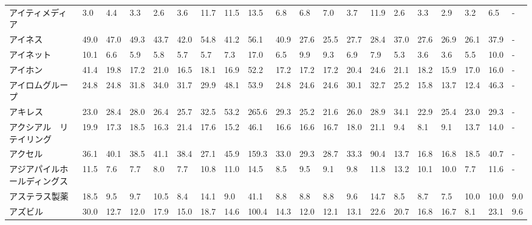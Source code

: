 \begin{tabular}{llllllllllllllllllll}
アイティメディア        &    3.0 &    4.4 &       3.3 &       2.6 &        3.6 &    11.7 &    11.5 &     13.5 &     6.8 &     6.8 &    7.0 &    3.7 &    11.9 &     2.6 &     3.3 &    2.9 &    3.2 &     6.5 &      - \\
アイネス            &   49.0 &   47.0 &      49.3 &      43.7 &       42.0 &    54.8 &    41.2 &     56.1 &    40.9 &    27.6 &   25.5 &   27.7 &    28.4 &    37.0 &    27.6 &   26.9 &   26.1 &    37.9 &      - \\
アイネット           &   10.1 &    6.6 &       5.9 &       5.8 &        5.7 &     5.7 &     7.3 &     17.0 &     6.5 &     9.9 &    9.3 &    6.9 &     7.9 &     5.3 &     3.6 &    3.6 &    5.5 &    10.0 &      - \\
アイホン            &   41.4 &   19.8 &      17.2 &      21.0 &       16.5 &    18.1 &    16.9 &     52.2 &    17.2 &    17.2 &   17.2 &   20.4 &    24.6 &    21.1 &    18.2 &   15.9 &   17.0 &    16.0 &      - \\
アイロムグループ        &   24.8 &   24.8 &      31.8 &      34.0 &       31.7 &    29.9 &    48.1 &     53.9 &    24.8 &    24.6 &   24.6 &   30.1 &    32.7 &    25.2 &    15.8 &   13.7 &   12.4 &    46.3 &      - \\
アキレス            &   23.0 &   28.4 &      28.0 &      26.4 &       25.7 &    32.5 &    53.2 &    265.6 &    29.3 &    25.2 &   21.6 &   26.0 &    28.9 &    34.1 &    22.9 &   25.4 &   23.0 &    29.3 &      - \\
アクシアル　リテイリング    &   19.9 &   17.3 &      18.5 &      16.3 &       21.4 &    17.6 &    15.2 &     46.1 &    16.6 &    16.6 &   16.7 &   18.0 &    21.1 &     9.4 &     8.1 &    9.1 &   13.7 &    14.0 &      - \\
アクセル            &   36.1 &   40.1 &      38.5 &      41.1 &       38.4 &    27.1 &    45.9 &    159.3 &    33.0 &    29.3 &   28.7 &   33.3 &    90.4 &    13.7 &    16.8 &   16.8 &   18.5 &    40.7 &      - \\
アジアパイルホールディングス  &   11.5 &    7.6 &       7.7 &       8.0 &        7.7 &    10.8 &    11.0 &     14.5 &     8.5 &     9.5 &    9.1 &    9.8 &    11.8 &    13.2 &    10.1 &   10.0 &    7.7 &    11.6 &      - \\
アステラス製薬         &   18.5 &    9.5 &       9.7 &      10.5 &        8.4 &    14.1 &     9.0 &     41.1 &     8.8 &     8.8 &    8.8 &    9.6 &    14.7 &     8.5 &     8.7 &    7.5 &   10.0 &    10.0 &    9.0 \\
アズビル            &   30.0 &   12.7 &      12.0 &      17.9 &       15.0 &    18.7 &    14.6 &    100.4 &    14.3 &    12.0 &   12.1 &   13.1 &    22.6 &    20.7 &    16.8 &   16.7 &    8.1 &    23.1 &    9.6 \\

\end{tabular}
